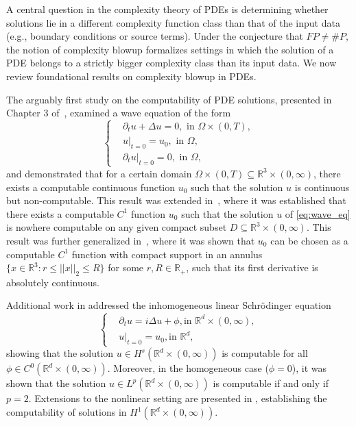 \documentclass[pdflatex]{sn-jnl}%
\begin{document}
A central question in the complexity theory of PDEs is determining whether solutions lie in a different complexity function class than that of the input data (e.g., boundary conditions or source terms). Under the conjecture that $FP\neq\#P$, the notion of complexity blowup formalizes settings in which the solution of a PDE belongs to a strictly bigger complexity class than its input data. We now review foundational results on complexity blowup in PDEs.

The arguably first study on the computability of PDE solutions, presented in Chapter 3 of~\cite{Pour-El1989-yg}, examined a wave equation of the form
\begin{equation}\label{eq:wave_eq}
\left\{
\begin{aligned}
&\partial_tu +\Delta u = 0,\textrm{ in }\Omega\times(0,T),\\&
u|_{t=0} = u_0,\textrm{ in }\Omega,\\&
\partial_tu\bigr|_{t=0} = 0,\textrm{ in }\Omega,
\end{aligned}\right.
\end{equation}
and demonstrated that for a certain domain $\Omega\times (0,T)\subseteq \mathbb{R}^3\times(0,\infty)$, there exists a computable continuous function $u_0$ such that the solution $u$ is continuous but non-computable. This result was extended in~\cite{Pour-El1997-br}, where it was established that there exists a computable $C^1$ function $u_0$ such that the solution $u$ of \eqref{eq:wave_eq} is nowhere computable on any given compact subset $D\subseteq \mathbb{R}^3\times(0,\infty)$. This result was further generalized in~\cite{Boche2020-uu}, where it was shown that $u_0$ can be chosen as a computable $C^1$ function with compact support in an annulus $\{x\in \mathbb{R}^3: r\leq||x||_2\leq R\}$ for some $r,R\in \mathbb{R}_{+}$, such that its first derivative is absolutely continuous.

Additional work in \cite{Weihrauch2001-rm} addressed the inhomogeneous linear Schr\"odinger equation
\begin{equation}
    \left\{\begin{aligned}
        &\partial_tu = i\Delta u +\phi\mathrm{, in }\,\, \mathbb{R}^d\times (0,\infty),\\&
        u|_{t=0} = u_0 \mathrm{, in }\,\, \mathbb{R}^d,
    \end{aligned}\right.
\end{equation}
showing that the solution $u \in H^s(\mathbb{R}^d\times (0,\infty))$ is computable for all $\phi\in C^0(\mathbb{R}^d\times (0,\infty))$. Moreover, in the homogeneous case ($\phi = 0$), it was shown that the solution $u \in L^p(\mathbb{R}^d\times (0,\infty))$ is computable if and only if $p = 2$. Extensions to the nonlinear setting are presented in \cite{Weihrauch2006-cp}, establishing the computability of solutions in $H^1(\mathbb{R}^d\times (0,\infty))$.
\end{document}
